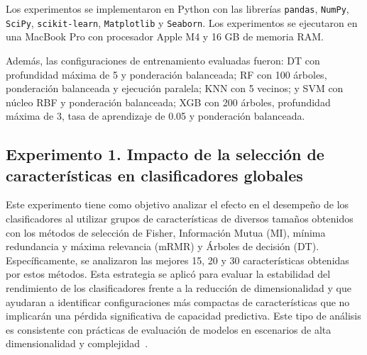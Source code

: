 \documentclass[runningheads]{llncs}
\begin{document}
Los experimentos se implementaron en Python con las librerías \texttt{pandas}, \texttt{NumPy}, \texttt{SciPy}, \texttt{scikit-learn}, \texttt{Matplotlib} y \texttt{Seaborn}. Los experimentos se ejecutaron en una MacBook Pro con procesador Apple M4 y 16 GB de memoria RAM.

Además, las configuraciones de entrenamiento evaluadas fueron: DT con profundidad máxima de 5 y ponderación balanceada; RF con 100 árboles, ponderación balanceada y ejecución paralela; KNN con 5 vecinos; y SVM con núcleo RBF y ponderación balanceada; XGB con 200 árboles, profundidad máxima de 3, tasa de aprendizaje de 0.05 y ponderación balanceada.

\subsection{Experimento 1. Impacto de la selección de características en clasificadores globales}
Este experimento tiene como objetivo analizar el efecto en el desempeño de los clasificadores al utilizar grupos de características de diversos tamaños obtenidos con los métodos de selección de Fisher, Información Mutua (MI), mínima redundancia y máxima relevancia (mRMR) y Árboles de decisión (DT). Específicamente, se analizaron las mejores 15, 20 y 30 características obtenidas por estos métodos. Esta estrategia se aplicó para evaluar la estabilidad del rendimiento de los clasificadores frente a la reducción de dimensionalidad y que ayudaran a  identificar configuraciones más compactas de características que no implicarán una  pérdida significativa de capacidad predictiva. Este tipo de análisis  es consistente con prácticas de evaluación de modelos en escenarios de alta dimensionalidad y complejidad~\cite{Goodfellow2016}.

\FloatBarrier
\end{document}
